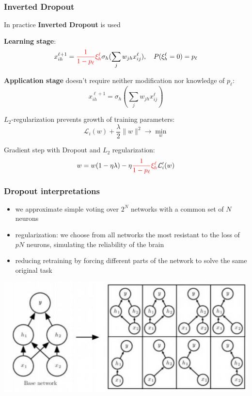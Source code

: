 \documentclass[fullscreen=true, bookmarks=true, hyperref={pdfencoding=unicode}]{beamer}
\begin{document}
\begin{frame}
\frametitle{Inverted Dropout}
    In practice {\bf Inverted Dropout} is used

    \pause
    {\bf Learning stage}:
   $$x_{ih}^{\ell + 1} = {\color{red}\frac{1}{1-p_\ell} \xi_h^\ell} \sigma_h (\sum\limits_j w_{jh} x_{ ij}^\ell), \ \ \
    P(\xi_h^\ell = 0) = p_\ell$$

    \pause
   {\bf Application stage} doesn't require neither modification nor knowledge of $p_\ell$:
   $$x_{ih}^{\ell + 1} = \sigma_h(\sum\limits_j w_{jh} x_{ij}^\ell)$$

   $L_2$-regularization prevents growth of training parameters:
   $$\mathcal{L}_i(w) + \frac{\lambda}{2} \|w\|^2 \to \min\limits_w$$

   Gradient step with Dropout and $L_2$ regularization:
   $$w = w (1 - \eta \lambda) - \eta{\color{red}\frac{1}{1-p_\ell} \xi_h^\ell} \mathcal{L}_i^\prime(w )$$
\end{frame}


\begin{frame}
  \frametitle{Dropout interpretations}

  \begin{itemize}
    \pause
    \item we approximate simple voting over $2^N$ networks with a common set of $N$ neurons
    \pause
    \item regularization: we choose from all networks the most resistant to the loss of $pN$ neurons, simulating the reliability of the brain
    \pause
    \item reducing retraining by forcing different parts of the network to solve the same original task
  \end{itemize}
  \pause
  \begin{center}
    \includegraphics[keepaspectratio,
                     width=0.5\paperwidth]{dropout_interpretation.jpg}
  \end{center}
\end{frame}
\end{document}
